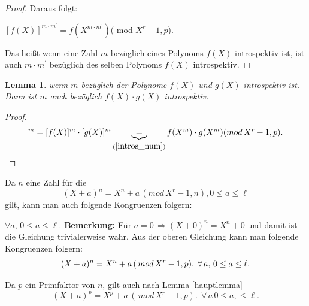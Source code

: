 \documentclass[12pt,oneside]{article}
\newtheorem{lemma}[theorem]{Lemma}
\theoremstyle{remark}
\theoremstyle{definition}
\begin{document}
\begin{flushleft}
\begin{proof}
Daraus folgt:\newline\newline
\centerline{$[f(X)]^{m \cdot m^{'}} = f(X^{m \cdot m^{'}}) $( mod $X^r - 1, p$).}\newline

Das heißt wenn eine Zahl $m$ bezüglich eines Polynoms $f(X)$ introspektiv ist, ist auch $m \cdot m^{'}$ bezüglich des selben Polynoms $f(X)$ introspektiv. 
\end{proof}

\smallskip

\begin{lemma}\label{intros_pol}
wenn $m$ bezüglich der Polynome $f(X)$ und $g(X)$ introspektiv ist. Dann ist $m$ auch bezüglich $f(X) \cdot g(X)$ introspektiv.  
\end{lemma}
\begin{proof}
\begin{align*}
    [f(X) \cdot g(X)]^{m} = [f(X)]^m \cdot [g(X)]^m \underbrace{=}_{(\ref{intros_num})} f(X^m) \cdot g(X^m)(mod \, X^r - 1, p).
\end{align*}

\end{proof}

Da $n$ eine Zahl für die 
\begin{equation}
    (X + a)^n = X^n + a \, (mod  \, X^r - 1, n), 0 \leq a \leq \ell
\end{equation}
gilt, kann man auch folgende Kongruenzen folgern:

$\forall a$, $ 0 \leq a \leq \ell$.\newline\newline
\textbf{Bemerkung:} Für $a = 0 \,  \Rightarrow (X + 0)^n = X^n + 0$ und damit ist die Gleichung trivialerweise wahr.\newline\newline 
Aus der oberen Gleichung kann man folgende Kongruenzen folgern:
\begin{equation}\label{fintro}
(X + a)^n = X^n + a \, (\, mod \, X^r - 1, p).
\; \, \forall\,a, \, 0 \leq a \leq \ell.\newline\newline
\end{equation}

Da $p$ ein Primfaktor von $n$, gilt auch nach Lemma \ref{hauptlemma} \newline
\begin{equation}\label{sintro}
    (X + a)^p = X^p + a \, (\, mod \, X^r - 1, p). \; \, \forall\,a \, 0 \leq a, \leq \ell.
\end{equation}


\end{flushleft}
\end{document}
